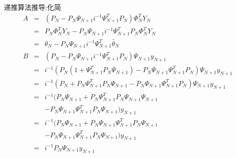 \begin{frame}{递推算法推导:化简}
\begin{eqnarray*}
A &=& (P_N -P_N\Psi_{N+1}i^{-1}\Psi_{N+1}^T P_N )\Phi_N^T Y_N\\
&=& P_N\Phi_N^T Y_N -P_N\Psi_{N+1}i^{-1}\Psi_{N+1}^T P_N \Phi_N^T Y_N\\
&=& \hat\theta_N-P_N\Psi_{N+1}i^{-1}\Psi_{N+1}^T \hat\theta_N\\
B &=& (P_N -P_N\Psi_{N+1}i^{-1}\Psi_{N+1}^T P_N )\Psi_{N+1}y_{N+1}\\
&=& i^{-1}(P_N(1+\Psi_{N+1}^T P_N \Psi_{N+1}) -P_N\Psi_{N+1}\Psi_{N+1}^T P_N )\Psi_{N+1}y_{N+1}\\
&=& i^{-1}(P_N+P_N\Psi_{N+1}^T P_N \Psi_{N+1} -P_N\Psi_{N+1}\Psi_{N+1}^T P_N )\Psi_{N+1}y_{N+1}\\
&=& i^{-1}(P_N\Psi_{N+1}+P_N\Psi_{N+1}^T P_N \Psi_{N+1}\Psi_{N+1} \\
&&  -P_N\Psi_{N+1}\Psi_{N+1}^T P_N \Psi_{N+1})y_{N+1}\\
&=& i^{-1}(P_N\Psi_{N+1}+P_N\Psi_{N+1}\Psi_{N+1}^T P_N \Psi_{N+1} \\
&& -P_N\Psi_{N+1}\Psi_{N+1}^T P_N \Psi_{N+1})y_{N+1}\\
&=& i^{-1}P_N\Psi_{N+1}y_{N+1}
\end{eqnarray*}
\end{frame}
\egroup

